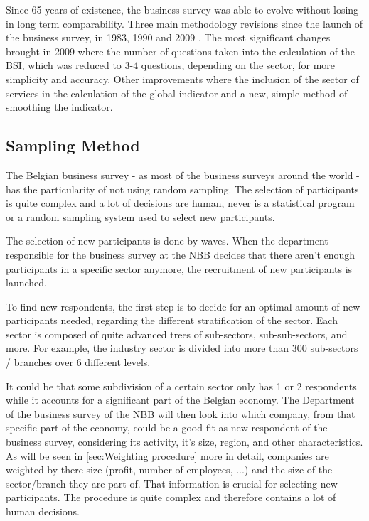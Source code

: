 \documentclass[12pt,a4paper,oneside]{book}
\begin{document}
Since 65 years of existence, the business survey was able to evolve without losing in long term comparability.
Three main methodology revisions since the launch of the business survey, in 1983, 1990 and 2009 \cite{de_greef_national_2009}.
The most significant changes brought in 2009 where the number of questions taken into the calculation of the BSI, which was reduced to 3-4 questions, depending on the sector, for more simplicity and accuracy.
Other improvements where the inclusion of the sector of services in the calculation of the global indicator and a new, simple method of smoothing the indicator.

\subsection{Sampling Method}
\label{sec:Recruitment of participants}

The Belgian business survey - as most of the business surveys around the world - has the particularity of not using random sampling. 
The selection of participants is quite complex and a lot of decisions are human, never is a statistical program or a random sampling system used to select new participants.

The selection of new participants is done by waves. When the department responsible for the business survey at the NBB decides that there aren't enough participants in a specific sector anymore, the recruitment of new participants is launched.

To find new respondents, the first step is to decide for an optimal amount of new participants needed, regarding the different stratification of the sector.
Each sector is composed of quite advanced trees of sub-sectors, sub-sub-sectors, and more. For example, the industry sector is divided into more than 300 sub-sectors / branches over 6 different levels. 

It could be that some subdivision of a certain sector only has 1 or 2 respondents while it accounts for a significant part of the Belgian economy. The Department of the business survey of the NBB will then look into which company, from that specific part of the economy, could be a good fit as new respondent of the business survey, considering its activity, it's size, region, and other characteristics.
As will be seen in \autoref{sec:Weighting procedure} more in detail, companies are weighted by there size (profit, number of employees, ...) and the size of the sector/branch they are part of. That information is crucial for selecting new participants.
The procedure is quite complex and therefore contains a lot of human decisions.
 
\end{document}
